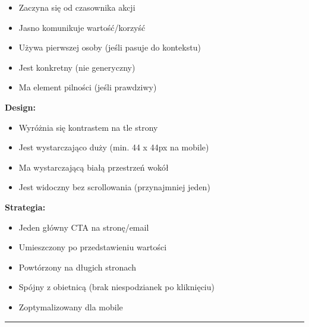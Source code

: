 \documentclass[
  12pt,
  a4paper,
  twoside,
  openright,
  12pt,
  DIV=12,
  BCOR=12mm]{scrbook}
\providecommand{\tightlist}{%
  \setlength{\itemsep}{0pt}\setlength{\parskip}{0pt}}\usepackage{longtable,booktabs,array}
\newcommand{\decoline}{%
  \begin{center}
    \textcolor{bordergray}{\rule{0.3\textwidth}{0.5pt}}
  \end{center}
}
\begin{document}
\begin{itemize}
\tightlist
\item[$\square$]
  Zaczyna się od czasownika akcji
\item[$\square$]
  Jasno komunikuje wartość/korzyść
\item[$\square$]
  Używa pierwszej osoby (jeśli pasuje do kontekstu)
\item[$\square$]
  Jest konkretny (nie generyczny)
\item[$\square$]
  Ma element pilności (jeśli prawdziwy)
\end{itemize}

\textbf{Design:}

\begin{itemize}
\tightlist
\item[$\square$]
  Wyróżnia się kontrastem na tle strony
\item[$\square$]
  Jest wystarczająco duży (min. 44 x 44px na mobile)
\item[$\square$]
  Ma wystarczającą białą przestrzeń wokół
\item[$\square$]
  Jest widoczny bez scrollowania (przynajmniej jeden)
\end{itemize}

\textbf{Strategia:}

\begin{itemize}
\tightlist
\item[$\square$]
  Jeden główny CTA na stronę/email
\item[$\square$]
  Umieszczony po przedstawieniu wartości
\item[$\square$]
  Powtórzony na długich stronach
\item[$\square$]
  Spójny z obietnicą (brak niespodzianek po kliknięciu)
\item[$\square$]
  Zoptymalizowany dla mobile
\end{itemize}

\decoline
\end{document}
